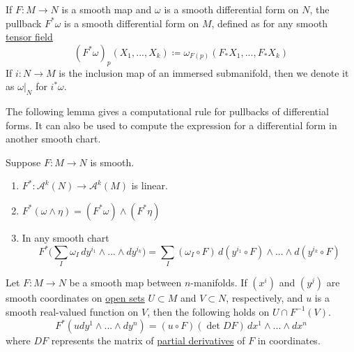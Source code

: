 \documentclass{article}
\newcounter{theorem}[section]
\begin{document}
    If $F: M \to N$ is a smooth map and $\omega$ is a smooth differential form on $N$, the pullback $F^* \omega$ is a smooth differential form on $M$, defined as for any smooth \hyperref[def:tensor-field]{tensor field} 
    \begin{equation}
      (F^* \omega)_p (X_1, ..., X_k) \coloneqq \omega_{F(p)} (F_* X_1, ..., F_* X_k)
    \end{equation}
    If $i: N \to M$ is the inclusion map of an immersed submanifold, then we denote it as $\omega \big|_N$ for $i^* \omega$. 

    The following lemma gives a computational rule for pullbacks of differential forms. It can also be used to compute the expression for a differential form in another smooth chart. 
    \begin{lemma}
      \label{thm:properties-of-the-pullback-on-forms}
    Suppose $F: M \to N$ is smooth. 
    \begin{enumerate}
        \item $F^*: \mathcal{A}^k (N) \to \mathcal{A}^k (M)$ is linear. 
        \item $F^* (\omega \wedge \eta) = (F^* \omega) \wedge (F^* \eta)$
        \item In any smooth chart 
        \begin{equation}
          F^* \Big( \sum_I \omega_I \, dy^{i_1} \wedge ... \wedge dy^{i_k} \Big) = \sum_I (\omega_I \circ F) \, d(y^{i_1} \circ F) \wedge ... \wedge d(y^{i_k} \circ F)
        \end{equation}
    \end{enumerate}
    \end{lemma}

    \begin{theorem}
      \label{thm:pullback-of-a-top-degree-form-in-coordinates}
    Let $F: M \to N$ be a smooth map between $n$-manifolds. If $(x^i)$ and $(y^j)$ are smooth coordinates on \hyperref[pst-def:open-set]{open sets} $U \subset M$ and $V \subset N$, respectively, and $u$ is a smooth real-valued function on $V$, then the following holds on $U \cap F^{-1} (V)$. 
    \begin{equation}
      F^* (u dy^1 \wedge ... \wedge dy^n) = (u \circ F) (\det{DF})\, dx^1 \wedge ... \wedge dx^n
    \end{equation}
    where $DF$ represents the matrix of \hyperref[mv-def:partial-derivative]{partial derivatives} of $F$ in coordinates. 
    \end{theorem}
\end{document}
